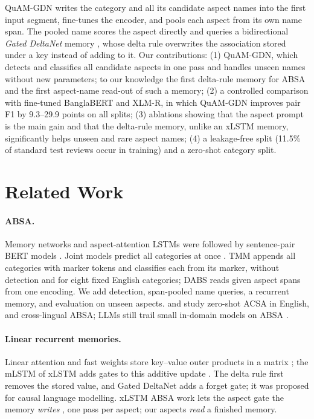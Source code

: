 \documentclass[11pt]{article}
\newcommand{\quam}{QuAM-GDN}
\begin{document}
\quam{} writes the category and all its candidate aspect names into the first input segment, fine-tunes
the encoder, and pools each aspect from its own name span. The pooled name scores the aspect directly
and queries a bidirectional \emph{Gated DeltaNet} memory \citep{yang2025gdn}, whose delta rule
overwrites the association stored under a key instead of adding to it. Our contributions:
(1) \quam{}, which detects and classifies all candidate aspects in one pass and handles unseen names
without new parameters; to our knowledge the first delta-rule memory for ABSA and the first aspect-name
read-out of such a memory; (2) a controlled comparison with fine-tuned BanglaBERT and XLM-R, in which
\quam{} improves pair F1 by 9.3--29.9 points on all splits; (3) ablations showing that the aspect prompt
is the main gain and that the delta-rule memory, unlike an xLSTM memory, significantly helps unseen and
rare aspect names; (4) a leakage-free split (11.5\% of standard test reviews occur in training) and a
zero-shot category split.

\section{Related Work}

\paragraph{ABSA.} Memory networks \citep{tang2016memnet} and aspect-attention LSTMs \citep{wang2016atae}
were followed by sentence-pair BERT models \citep{sun2019auxiliary}. Joint models predict all
categories at once \citep{schmitt2018joint,hu2019can}. TMM \citep{wu2020tmm} appends all categories with
marker tokens and classifies each from its marker, without detection and for eight fixed English
categories; DABS \citep{xia2026dabs} reads given aspect spans from one encoding. We add detection,
span-pooled name queries, a recurrent memory, and evaluation on unseen aspects. \citet{liu2021acsagen}
and \citet{ventirozos2025zeroshotacsa} study zero-shot ACSA in English, and \citet{fehle2026crosslingual}
cross-lingual ABSA; LLMs still trail small in-domain models on ABSA \citep{zhang2024llmsentiment}.

\paragraph{Linear recurrent memories.} Linear attention and fast weights store key--value outer
products in a matrix \citep{katharopoulos2020transformers,schlag2021fastweights}; the mLSTM of xLSTM adds
gates to this additive update \citep{beck2024xlstm,beck2025xlstm7b}. The delta rule
\citep{schlag2021fastweights,yang2024deltanet} first removes the stored value, and Gated DeltaNet
\citep{yang2025gdn} adds a forget gate; it was proposed for causal language modelling. xLSTM ABSA work
lets the aspect gate the memory \emph{writes} \citep{lawan2025afmat,lawan2025gatemabsa}, one pass per
aspect; our aspects \emph{read} a finished memory.
\end{document}
